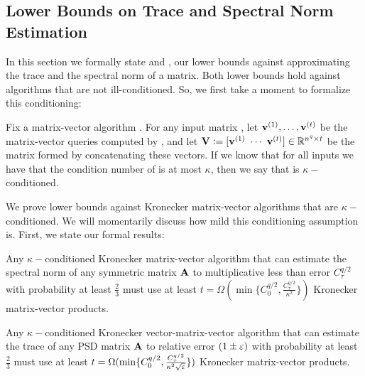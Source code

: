 

\subsection{Lower Bounds on Trace and Spectral Norm Estimation}
\label{app:adaptive-lower-bound-overview}

In this section we formally state  and , our lower bounds against approximating the trace and the spectral norm of a matrix.
Both lower bounds hold against algorithms that are not ill-conditioned.
So, we first take a moment to formalize this conditioning:

\begin{definition}
    Fix a matrix-vector algorithm \algo.
    For any input matrix \mA, let \(\boldsymbol{\mathrm{v}}^{(1)},\ldots,\boldsymbol{\mathrm{v}}^{(t)}\) be the matrix-vector queries computed by \algo, and let \(\mathbf{V} \;{\vcentcolon=}\; [\boldsymbol{\mathrm{v}}^{(1)} ~ \cdots ~ \boldsymbol{\mathrm{v}}^{(t)}] \in {\mathbb R}^{n^q \times t}\) be the matrix formed by concatenating these vectors.
    If we know that for all inputs \mA we have that the condition number of \mV is at most \(\kappa\), then we say that \algo is \(\kappa-\)conditioned.
\end{definition}

We prove lower bounds against Kronecker matrix-vector algorithms that are \(\kappa-\)conditioned.
We will momentarily discuss how mild this conditioning assumption is.
First, we state our formal results:

\begin{theorem}
    \label{thm:top-eig-lower-bound}
    Any \(\kappa-\)conditioned Kronecker matrix-vector algorithm that can estimate the spectral norm of any symmetric matrix \(\mathbf{A}\) to multiplicative less than error \(C_\tau^{q/2}\) with probability at least \(\frac23\) must use at least \(t = \Omega(\min\{C_0^{q/2}, \frac{C_\tau^{q/2}}{\kappa^2}\})\) Kronecker matrix-vector products.
\end{theorem}
\begin{theorem}
    \label{thm:trace-lower-bound}
    Any \(\kappa-\)conditioned Kronecker vector-matrix-vector algorithm that can estimate the trace of any PSD matrix \(\mathbf{A}\) to relative error \((1\pm\varepsilon)\) with probability at least \(\frac23\) must use at least \(t = \Omega(\min\{C_0^{q/2}, \frac{C_\tau^{q/2}}{\kappa^2 \sqrt{\varepsilon}}\})\) Kronecker matrix-vector products.
\end{theorem}

